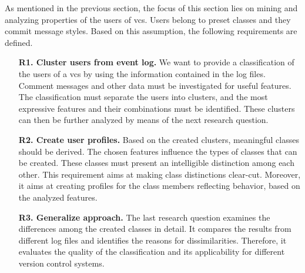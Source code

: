 
As mentioned in the previous section, the focus of this section lies on mining and analyzing properties of the users of \gls{vcs}. Users belong to preset classes and they commit message styles. Based on this assumption, the following requirements are defined.

\begin{itemize} %
      
\item[\textbf{R1. Cluster users from event log.}] 
We want to provide a classification of the users of a \gls{vcs} by using the information contained in the log files. Comment messages and other data must be investigated for useful features. The classification must separate the users into clusters, and the most expressive features and their combinations must be identified.  These clusters can then be further analyzed by means of the next research question.

\item[\textbf{R2. Create user profiles.}]
Based on the created clusters, meaningful classes should be derived. The chosen features influence the types of classes that can be created. These classes must present an intelligible distinction among each other. This requirement aims at making class distinctions clear-cut. Moreover, it aims at creating profiles for the class members reflecting behavior, based on the analyzed features.

\item[\textbf{R3. Generalize approach.}]
The last research question examines the differences among the created classes in detail. It compares the results from different log files and identifies the reasons for dissimilarities. Therefore, it evaluates the quality of the classification and its applicability for different version control systems.

\end{itemize}

